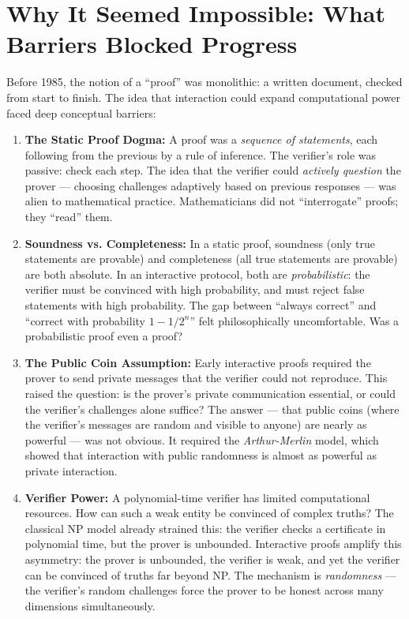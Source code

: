 \section{Why It Seemed Impossible: What Barriers Blocked Progress}
\label{sec:ip:impossible}

Before 1985, the notion of a ``proof'' was monolithic: a written document, checked from start to finish. The idea that interaction could expand computational power faced deep conceptual barriers:

\begin{enumerate}
\item \textbf{The Static Proof Dogma:} A proof was a \emph{sequence of statements}, each following from the previous by a rule of inference. The verifier's role was passive: check each step. The idea that the verifier could \emph{actively question} the prover --- choosing challenges adaptively based on previous responses --- was alien to mathematical practice. Mathematicians did not ``interrogate'' proofs; they ``read'' them.

\item \textbf{Soundness vs. Completeness:} In a static proof, soundness (only true statements are provable) and completeness (all true statements are provable) are both absolute. In an interactive protocol, both are \emph{probabilistic}: the verifier must be convinced with high probability, and must reject false statements with high probability. The gap between ``always correct'' and ``correct with probability $1 - 1/2^n$'' felt philosophically uncomfortable. Was a probabilistic proof even a proof?

\item \textbf{The Public Coin Assumption:} Early interactive proofs required the prover to send private messages that the verifier could not reproduce. This raised the question: is the prover's private communication essential, or could the verifier's challenges alone suffice? The answer --- that public coins (where the verifier's messages are random and visible to anyone) are nearly as powerful --- was not obvious. It required the \emph{Arthur-Merlin} model, which showed that interaction with public randomness is almost as powerful as private interaction.

\item \textbf{Verifier Power:} A polynomial-time verifier has limited computational resources. How can such a weak entity be convinced of complex truths? The classical NP model already strained this: the verifier checks a certificate in polynomial time, but the prover is unbounded. Interactive proofs amplify this asymmetry: the prover is unbounded, the verifier is weak, and yet the verifier can be convinced of truths far beyond NP. The mechanism is \emph{randomness} --- the verifier's random challenges force the prover to be honest across many dimensions simultaneously.


\end{enumerate}
